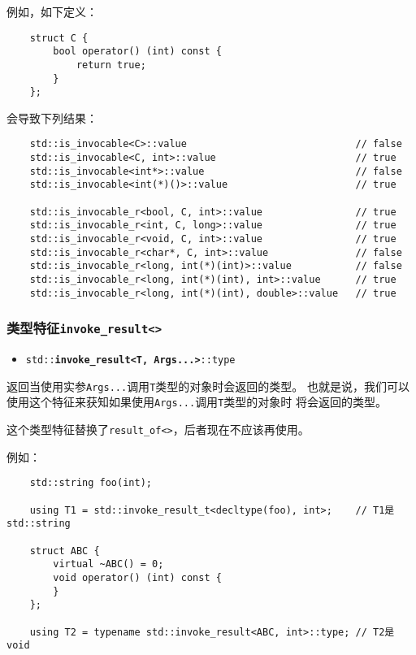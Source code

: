 例如，如下定义：
\begin{lstlisting}
    struct C {
        bool operator() (int) const {
            return true;
        }
    };
\end{lstlisting}
会导致下列结果：
\begin{lstlisting}
    std::is_invocable<C>::value                             // false
    std::is_invocable<C, int>::value                        // true
    std::is_invocable<int*>::value                          // false
    std::is_invocable<int(*)()>::value                      // true

    std::is_invocable_r<bool, C, int>::value                // true
    std::is_invocable_r<int, C, long>::value                // true
    std::is_invocable_r<void, C, int>::value                // true
    std::is_invocable_r<char*, C, int>::value               // false
    std::is_invocable_r<long, int(*)(int)>::value           // false
    std::is_invocable_r<long, int(*)(int), int>::value      // true
    std::is_invocable_r<long, int(*)(int), double>::value   // true
\end{lstlisting}

\subsubsection{类型特征\texttt{invoke\_result<>}}\label{ch21.2.0.5}
\begin{itemize}
    \item[] \texttt{std::\textbf{invoke\_result<T, Args...>}::type}
\end{itemize}
返回当使用实参\texttt{Args...}调用\texttt{T}类型的对象时会返回的类型。
也就是说，我们可以使用这个特征来获知如果使用\texttt{Args...}调用\texttt{T}类型的对象时
将会返回的类型。

这个类型特征替换了\texttt{result\_of<>}，后者现在不应该再使用。

例如：
\begin{lstlisting}
    std::string foo(int);

    using T1 = std::invoke_result_t<decltype(foo), int>;    // T1是std::string

    struct ABC {
        virtual ~ABC() = 0;
        void operator() (int) const {
        }
    };

    using T2 = typename std::invoke_result<ABC, int>::type; // T2是void
\end{lstlisting}

